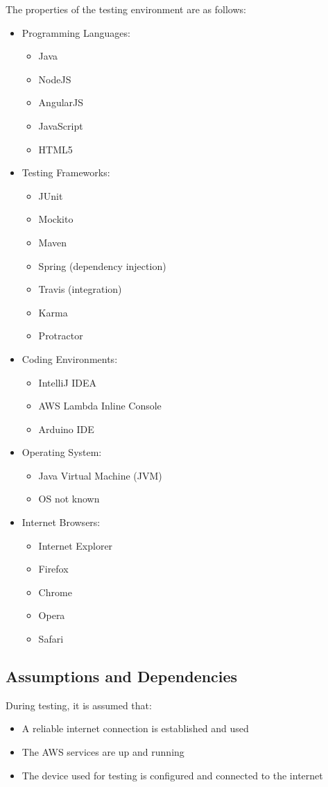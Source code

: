 \documentclass{article}
\begin{document}
		The properties of the testing environment are as follows:
		\begin{itemize}
			\item Programming Languages:
				\begin{itemize}
					\item Java
					\item NodeJS
					\item AngularJS
					\item JavaScript
					\item HTML5
				\end{itemize}
			\item Testing Frameworks:
				\begin{itemize}
					\item JUnit
					\item Mockito
					\item Maven
					\item Spring (dependency injection)
					\item Travis (integration)
					\item Karma
					\item Protractor
				\end{itemize}
			\item Coding Environments:
				\begin{itemize}
					\item IntelliJ IDEA
					\item AWS Lambda Inline Console
					\item Arduino IDE
				\end{itemize}
			\item Operating System:
				\begin{itemize}
					\item Java Virtual Machine (JVM)
					\item OS not known
				\end{itemize}
			\item Internet Browsers:
				\begin{itemize}
					\item Internet Explorer
					\item Firefox
					\item Chrome
					\item Opera
					\item Safari
				\end{itemize}
		\end{itemize}
	
	\subsection{Assumptions and Dependencies}
		During testing, it is assumed that:
		\begin{itemize}
			\item A reliable internet connection is established and used
			\item The AWS services are up and running
			\item The device used for testing is configured and connected to the internet
		\end{itemize}
		
\end{document}
